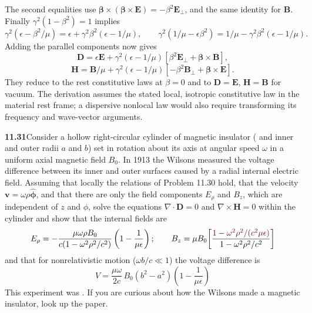 The second equalities use
$\boldsymbol\beta\times(\boldsymbol\beta\times\mathbf E)
=-\beta^2\mathbf E_\perp$, and the same identity for $\mathbf B$.
Finally $\gamma^2(1-\beta^2)=1$ implies
\[
\gamma^2(\epsilon-\beta^2/\mu)=\epsilon+
\gamma^2\beta^2(\epsilon-1/\mu),\qquad
\gamma^2(1/\mu-\epsilon\beta^2)=1/\mu-
\gamma^2\beta^2(\epsilon-1/\mu).
\]
Adding the parallel components now gives
\[
\boxed{\mathbf D=\epsilon\mathbf E+\gamma^2(\epsilon-1/\mu)
[\beta^2\mathbf E_\perp+\boldsymbol\beta\times\mathbf B],}
\]
\[
\boxed{\mathbf H=\mathbf B/\mu+\gamma^2(\epsilon-1/\mu)
[-\beta^2\mathbf B_\perp+\boldsymbol\beta\times\mathbf E].}
\]
They reduce to the rest constitutive laws at $\beta=0$ and to
$\mathbf D=\mathbf E$, $\mathbf H=\mathbf B$ for vacuum.
The derivation assumes the stated local, isotropic constitutive
law in the material rest frame; a dispersive nonlocal law would
also require transforming its frequency and wave-vector arguments.

\par\bigskip
\noindent\textbf{11.31}\quad Consider a hollow right-circular cylinder of magnetic insulator ( and inner and outer radii $a$ and $b$) set in rotation about its axis at angular speed $\omega$ in a uniform axial magnetic field $B_{0}$.  In 1913 the Wilsons measured the voltage difference between its inner and outer surfaces caused by a radial internal electric field. Assuming that locally the relations of Problem 11.30 hold, that the velocity $\mathbf{v}=\omega\rho\hat{\boldsymbol{\phi}}$, and that there are only the field components $E_{\rho}$ and $B_{z}$, which are independent of $z$ and $\phi$, solve the equations $\nabla\cdot\mathbf{D}=0$ and $\nabla\times\mathbf{H}=0$ within the cylinder and show that the internal fields are
\[
E_{\rho}=-\frac{\mu\omega\rho B_{0}}{c(1-\omega^{2}\rho^{2}/c^{2})}\left(1-\frac{1}{\mu\epsilon}\right);\qquad
B_{z}=\mu B_{0}\!\left[\frac{\erratum{1-\omega^{2}\rho^{2}/(c^{2}\mu\epsilon)}}{1-\omega^{2}\rho^{2}/c^{2}}\right]
\]
and that for nonrelativistic motion ($\omega b/c\ll1$) the voltage difference is
\[
V=\frac{\mu\omega}{2c}\,B_{0}(b^{2}-a^{2})\!\left(1-\frac{1}{\mu\epsilon}\right)
\]
This experiment was . If you are curious about how the Wilsons made a magnetic insulator, look up the paper.

